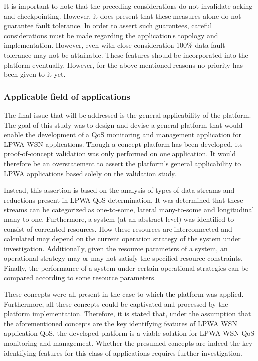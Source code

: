 It is important to note that the preceding considerations do not invalidate acking and checkpointing. However, it does present that these measures alone do not guarantee fault tolerance. In order to assert such guarantees, careful considerations must be made regarding the application's topology and implementation. However, even with close consideration 100\% data fault tolerance may not be attainable. These features should be incorporated into the platform eventually. However, for the above-mentioned reasons no priority has been given to it yet.

\subsubsection{Applicable field of applications}
The final issue that will be addressed is the general applicability of the platform. The goal of this study was to design and devise a general platform that would enable the development of a QoS monitoring and management application for LPWA WSN applications. Though a concept platform has been developed, its proof-of-concept validation was only performed on one application. It would therefore be an overstatement to assert the platform's general applicability to LPWA applications based solely on the validation study.

Instead, this assertion is based on the analysis of types of data streams and reductions present in LPWA QoS determination. It was determined that these streams can be categorized as one-to-some, lateral many-to-some and longitudinal many-to-one. Furthermore, a system (at an abstract level) was identified to consist of correlated resources. How these resources are interconnected and calculated may depend on the current operation strategy of the system under investigation. Additionally, given the resource parameters of a system, an operational strategy may or may not satisfy the specified resource constraints. Finally, the performance of a system under certain operational strategies can be compared according to some resource parameters.

These concepts were all present in the case to which the platform was applied. Furthermore, all these concepts could be captivated and processed by the platform implementation. Therefore, it is stated  that, under the assumption that the aforementioned concepts are the key identifying features of LPWA WSN application QoS, the developed platform is a viable solution for LPWA WSN QoS monitoring and management. Whether the presumed concepts are indeed the key identifying features for this class of applications requires further investigation.

